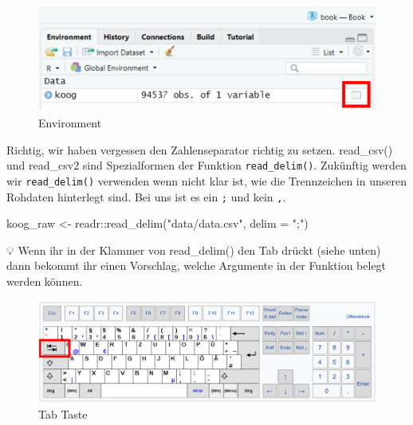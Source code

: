 \documentclass[
]{article}
\newenvironment{Shaded}{\begin{snugshade}}{\end{snugshade}}
\newcommand{\AttributeTok}[1]{\textcolor[rgb]{0.77,0.63,0.00}{#1}}
\newcommand{\FunctionTok}[1]{\textcolor[rgb]{0.00,0.00,0.00}{#1}}
\newcommand{\NormalTok}[1]{#1}
\newcommand{\OtherTok}[1]{\textcolor[rgb]{0.56,0.35,0.01}{#1}}
\newcommand{\SpecialCharTok}[1]{\textcolor[rgb]{0.00,0.00,0.00}{#1}}
\newcommand{\StringTok}[1]{\textcolor[rgb]{0.31,0.60,0.02}{#1}}
\begin{document}
\begin{figure}

{\centering \includegraphics[width=1\linewidth]{images/031} 

}

\caption{Environment}\label{fig:unnamed-chunk-110}
\end{figure}

Richtig, wir haben vergessen den Zahlenseparator richtig zu setzen. read\_csv() und read\_csv2 sind Spezialformen der Funktion \texttt{read\_delim()}. Zukünftig werden wir \texttt{read\_delim()} verwenden wenn nicht klar ist, wie die Trennzeichen in unseren Rohdaten hinterlegt sind. Bei uns ist es ein \texttt{;} und kein \texttt{,}.

\begin{Shaded}
\begin{Highlighting}[]
\NormalTok{koog\_raw }\OtherTok{\textless{}{-}}\NormalTok{ readr}\SpecialCharTok{::}\FunctionTok{read\_delim}\NormalTok{(}\StringTok{"data/data.csv"}\NormalTok{, }\AttributeTok{delim =} \StringTok{";"}\NormalTok{)}
\end{Highlighting}
\end{Shaded}

💡 Wenn ihr in der Klammer von read\_delim() den Tab drückt (siehe unten) dann bekommt ihr einen Vorschlag, welche Argumente in der Funktion belegt werden können.

\begin{figure}

{\centering \includegraphics[width=1\linewidth]{images/030} 

}

\caption{Tab Taste}\label{fig:unnamed-chunk-112}
\end{figure}
\end{document}
